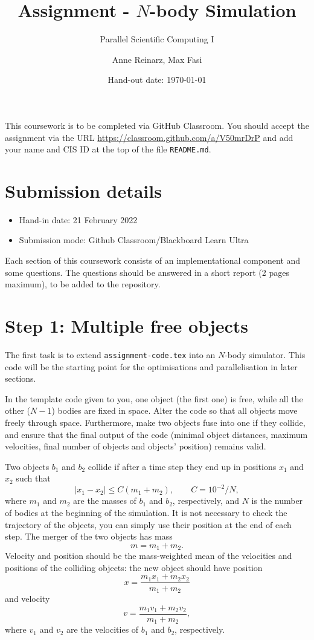 \documentclass[11pt,a4paper,DIV=12,pdftex]{scrartcl}
\author{Anne Reinarz, Max Fasi}
\title{Assignment - $N$-body Simulation}
\subtitle{Parallel Scientific Computing I}
\date{Hand-out date: \today}
\begin{document}
\parindent0pt

\maketitle

This coursework is to be completed via GitHub Classroom.
You should accept the assignment via the URL \url{https://classroom.github.com/a/V50mrDrP} and add your name and CIS ID at the top of the file \verb#README.md#.


\section*{Submission details}
\begin{itemize}
 \item Hand-in date: 21 February 2022
 \item Submission mode: Github Classroom/Blackboard Learn Ultra
\end{itemize}


Each section of this coursework consists of an implementational component and some questions. The questions should be answered in a short report (2 pages maximum), to be added to the repository.

\section*{Step 1: Multiple free objects}

The first task is to extend \verb#assignment-code.tex# into an $N$-body simulator.
This code will be the starting point for the optimisations and parallelisation in later sections.

In the template code given to you, one object (the first one) is free, while all the other ($N-1$) bodies are fixed in space. Alter the code so that all objects move freely through space. Furthermore, make two objects fuse into one if they collide, and ensure that the final output of the code (minimal object distances, maximum velocities, final number of objects and objects' position) remains valid.

Two objects $b_1$ and $b_2$ collide if after a time step they end up in positions $x_1$ and $x_2$ such that
$$|x_1 - x_2 | \leq C(m_1 + m_2 ),\qquad C = 10^{-2} / N,$$
where $m_1$ and $m_2$ are the masses of $b_1$ and $b_2$, respectively, and $N$ is the number of bodies at the beginning of the simulation. It is not necessary to check the trajectory of the objects, you can simply use their position at the end of each step.
The merger of the two objects has  mass
$$m = m_1 + m_2.$$
Velocity and position should be the mass-weighted mean of the velocities and positions of the colliding objects: the new object should have position
$$x = \frac{m_1 x_1 + m_2 x_2}{m_1 + m_2}$$
and velocity
$$v = \frac{m_1 v_1 + m_2 v_2}{m_1 + m_2},$$
where $v_1$ and $v_2$ are the velocities of $b_1$ and $b_2$, respectively.
\end{document}
